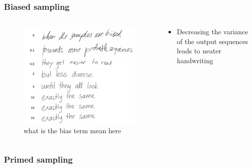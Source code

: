 \documentclass[10pt,xcolor=dvipsnames]{beamer}
\begin{document}
\begin{frame}
  \frametitle{Biased sampling}
\begin{columns}
  \begin{column}{.5\textwidth}
    \begin{figure}
      \centering
  \includegraphics[width=\linewidth]{fig/fig16.png}
      \caption{what is the bias term mean here}
      \label{fig:fig16}
    \end{figure}
  \end{column}

  \begin{column}{.5\textwidth}
    \begin{itemize}
    \item Decreasing the variance of the output sequences leads to neater handwriting
    \end{itemize}
  \end{column}
\end{columns}
\end{frame}

\begin{frame}
  \frametitle{Primed sampling}
  
\end{frame}
\end{document}
